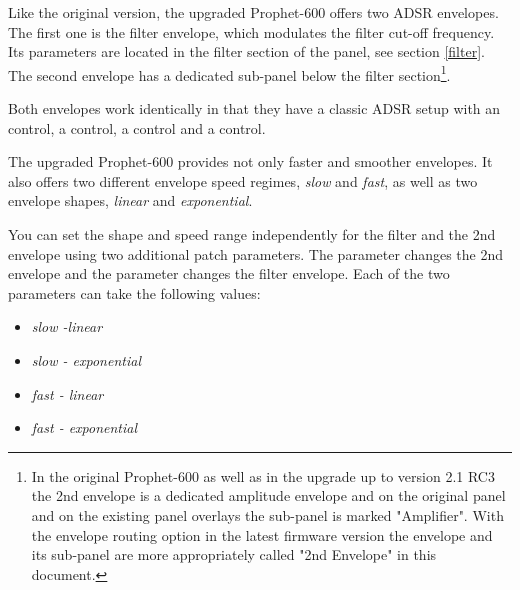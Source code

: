 Like the original version, the upgraded Prophet-600 offers two ADSR envelopes. The first one is the filter envelope, which modulates the filter cut-off frequency. Its parameters are located in the filter section of the panel, see section \ref{filter}. The second envelope has a dedicated sub-panel below the filter section\footnote{In the original Prophet-600 as well as in the upgrade up to version 2.1 RC3 the 2nd envelope is a dedicated amplitude envelope and on the original panel and on the existing panel overlays the sub-panel is marked "Amplifier". With the envelope routing option in the latest firmware version the envelope and its sub-panel are more appropriately called "2nd Envelope" in this document.}.

Both envelopes work identically in that they have a classic ADSR setup with an \attack control, a \decay control, a \sustain control and a \release control. 

\begin{center}
\end{center}

The upgraded Prophet-600 provides not only faster and smoother envelopes. It also offers two different envelope speed regimes, \textit{slow} and \textit{fast}, as well as two envelope shapes, \textit{linear} and \textit{exponential}.

You can set the shape and speed range independently for the filter and the 2nd envelope using two additional patch parameters. The parameter \secndenv changes the 2nd envelope and the parameter \filenv changes the filter envelope. Each of the two parameters can take the following values:

\begin{itemize}
  \setlength\itemsep{0cm}
  \item \textit{slow -linear}
  \item \textit{slow - exponential}
  \item \textit{fast - linear}
  \item \textit{fast - exponential}
\end{itemize}
 
